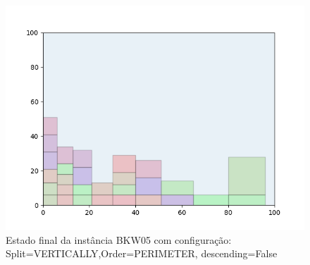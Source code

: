 \begin{figure}[H]
    \centering
    \caption[]{Estado final da instância BKW05 com configuração: Split=VERTICALLY,Order=PERIMETER, descending=False}
    \label{fig:bkw05-vertically-perimeter-false}
    \includegraphics[scale=0.5]{output/figures/bkw/bkw05/vertically/perimeter/false/00}
\end{figure}